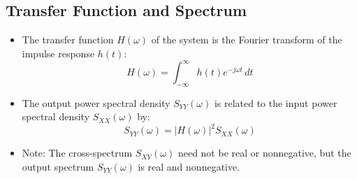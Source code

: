 \documentclass[12pt]{article}
\begin{document}
\subsection{Transfer Function and Spectrum}
\begin{itemize}
    \item The transfer function \( H(\omega) \) of the system is the Fourier transform of the impulse response \( h(t) \):
    \[
    H(\omega) = \int_{-\infty}^{\infty} h(t) e^{-j\omega t} \, dt
    \]
    \item The output power spectral density \( S_{YY}(\omega) \) is related to the input power spectral density \( S_{XX}(\omega) \) by:
    \[
    S_{YY}(\omega) = |H(\omega)|^2 S_{XX}(\omega)
    \]
    \item Note: The cross-spectrum \( S_{XY}(\omega) \) need not be real or nonnegative, but the output spectrum \( S_{YY}(\omega) \) is real and nonnegative.
\end{itemize}
\end{document}
